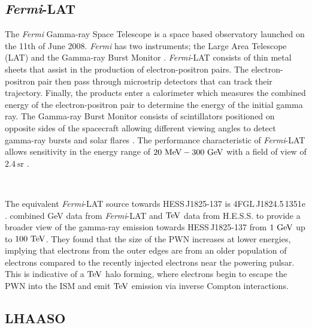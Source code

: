 \subsection{\textit{Fermi}-LAT}

The \textit{Fermi} Gamma-ray Space Telescope is a space based observatory launched on the 11th of June 2008. \textit{Fermi} has two instruments; the Large Area Telescope (LAT) and the Gamma-ray Burst Monitor \citep{2010RPPh...73g4901M}. \textit{Fermi}-LAT consists of thin metal sheets that assist in the production of electron-positron pairs. The electron-positron pair then pass through microstrip detectors that can track their trajectory. Finally, the products enter a calorimeter which measures the combined energy of the electron-positron pair to determine the energy of the initial gamma ray. The Gamma-ray Burst Monitor consists of scintillators positioned on opposite sides of the spacecraft allowing different viewing angles to detect gamma-ray bursts and solar flares \citep{2010RPPh...73g4901M}. The performance characteristic of \textit{Fermi}-LAT allows sensitivity in the energy range of $20~\si{\mega\electronvolt} - 300~\si{\giga\electronvolt}$ with a field of view of $2.4~\si{\steradian}$ \citep{2010RPPh...73g4901M}. 
\par~\par
The equivalent \textit{Fermi}-LAT source towards \mbox{HESS\,J1825-137} is \mbox{4FGL\,J1824.5\,1351e} \citep{2020ApJS..247...33A}.\cite{2020A&A...640A..76P} combined GeV data from \textit{Fermi}-LAT and $\TeV$ data from H.E.S.S. to provide a broader view of the gamma-ray emission towards \mbox{HESS\,J1825-137} from $1~\si{\giga\electronvolt}$ up to $100~\TeV$. They found that the size of the PWN increases at lower energies, implying that electrons from the outer edges are from an older population of electrons compared to the recently injected electrons near the powering pulsar. This is indicative of a $\TeV$ halo forming, where electrons begin to escape the PWN into the ISM and emit $\TeV$ emission via inverse Compton interactions.

\subsection{LHAASO}

